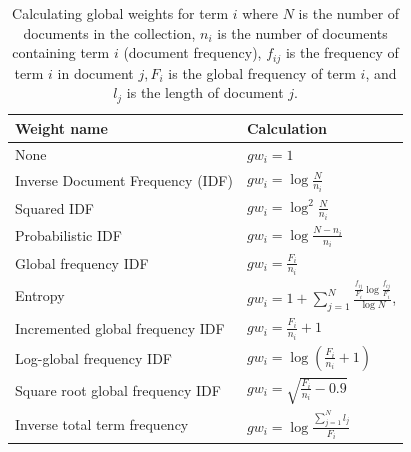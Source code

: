\documentclass[11pt,openany,executivepaper]{book}
\begin{document}
\begin{table}[ht]
\begin{center}
\caption{Calculating global weights for term $i$ where $N$ is the number of documents in the collection, $n_{i}$ is the number of documents containing term $i$ (document frequency), $f_{i j}$ is the frequency of term $i$ in document $j, F_{i}$ is the global frequency of term $i$, and $l_{j}$ is the length of document $j$.}
\begin{tabular}{l|l}
\hline
Weight name & Calculation \\
\hline
None & $g w_{i}=1$ \\
\hline
Inverse Document Frequency (IDF) & $g w_{i}=\log \frac{N}{n_{i}}$ \\
\hline
Squared IDF & $g w_{i}=\log ^{2} \frac{N}{n_{i}}$ \\
\hline
Probabilistic IDF & $g w_{i}=\log \frac{N-n_{i}}{n_{i}}$ \\
\hline
Global frequency IDF & $g w_{i}=\frac{F_{i}}{n_{i}}$ \\
\hline
Entropy & $g w_{i}=1+\sum_{j=1}^{N} \frac{\frac{f_{i j}}{F_{i}} \log \frac{f_{i j}}{F_{i}}}{\log N}$, \\
\hline
Incremented global frequency IDF & $g w_{i}=\frac{F_{i}}{n_{i}}+1$ \\
\hline
Log-global frequency IDF & $g w_{i}=\log \left(\frac{F_{i}}{n_{i}}+1\right)$ \\
\hline
Square root global frequency IDF & $g w_{i}=\sqrt{\frac{F_{i}}{n_{i}}-0.9}$ \\
\hline
Inverse total term frequency & $g w_{i}=\log \frac{\sum_{j=1}^{N} l_{j}}{F_{i}}$ \\
\hline
\end{tabular}
\end{center}
\end{table}
\end{document}
